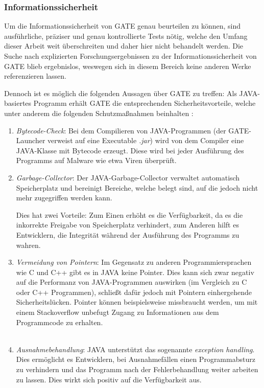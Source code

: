 \documentclass[12pt]{report}
\begin{document}
\subsubsection{Informationssicherheit}

Um die Informationssicherheit von GATE genau beurteilen zu können, sind ausführliche, präziser und genau kontrollierte Tests nötig, welche den Umfang dieser Arbeit weit überschreiten und daher hier nicht behandelt werden. Die Suche nach explizierten Forschungsergebnissen zu der Informationssicherheit von GATE blieb ergebnislos, weswegen sich in diesem Bereich keine anderen Werke referenzieren lassen.

Dennoch ist es möglich die folgenden Aussagen über GATE zu treffen:
Als JAVA-basiertes Programm erhält GATE die entsprechenden Sicherheitsvorteile, welche unter anderem die folgenden Schutzmaßnahmen beinhalten \cite{do18}:
\begin{enumerate}
\item \textit{Bytecode-Check}: Bei dem Compilieren von JAVA-Programmen (der GATE-Launcher verweist auf eine Executable \textit{.jar}) wird von dem Compiler eine JAVA-Klasse mit Bytecode erzeugt. Diese wird bei jeder Ausführung des Programms auf Malware wie etwa Viren überprüft. 
\item \textit{Garbage-Collector}: Der JAVA-Garbage-Collector verwaltet automatisch Speicherplatz und bereinigt Bereiche, welche belegt sind, auf die jedoch nicht mehr zugegriffen werden kann. 

Dies hat zwei Vorteile: Zum Einen erhöht es die Verfügbarkeit, da es die inkorrekte Freigabe von Speicherplatz verhindert, zum Anderen hilft es Entwicklern, die Integrität während der Ausführung des Programms zu wahren. 
\item \textit{Vermeidung von Pointern}: Im Gegensatz zu anderen Programmiersprachen wie C und C++ gibt es in JAVA keine Pointer. Dies kann sich zwar negativ auf die Performanz von JAVA-Programmen auswirken (im Vergleich zu C oder C++ Programmen), schließt dafür jedoch mit Pointern einhergehende Sicherheitslücken. Pointer können beispielsweise missbraucht werden, um mit einem \glqq Stackoverflow\grqq{} unbefugt Zugang zu Informationen aus dem Programmcode zu erhalten. 
\\
\\
\item \textit{Ausnahmebehandlung}: JAVA unterstützt das sogenannte \textit{exception handling}. Dies ermöglicht es Entwicklern, bei Ausnahmefällen einen Programmabsturz zu verhindern und das Programm nach der Fehlerbehandlung weiter arbeiten zu lassen. Dies wirkt sich positiv auf die Verfügbarkeit aus.
\end{enumerate}
\end{document}
